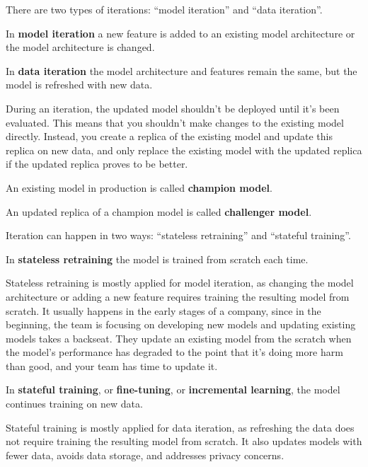 There are two types of iterations: ``model iteration'' and ``data iteration''.

In \textbf{model iteration} a new feature is added to an existing model architecture or the model architecture is
changed.
\ed

In \textbf{data iteration} the model architecture and features remain the same, but the model is refreshed with new
data.
\ed

During an iteration, the updated model shouldn't be deployed until it's been evaluated. This means that you shouldn't
make changes to the existing model directly. Instead, you create a replica of the existing model and update this
replica on new data, and only replace the existing model with the updated replica if the updated replica proves to be
better.

An existing model in production is called \textbf{champion model}.
\ed

An updated replica of a champion model is called \textbf{challenger model}.
\ed


Iteration can happen in two ways: ``stateless retraining'' and ``stateful training''.

In \textbf{stateless retraining} the model is trained from scratch each time.
\ed

Stateless retraining is mostly applied for model iteration, as changing the model architecture or adding a new
feature requires training the resulting model from scratch. It usually happens in the early stages of a company,
since in the beginning, the team is focusing on developing new models and updating existing models takes a backseat.
They update an existing model from the scratch when the model's performance has degraded to the point that it's doing
more harm than good, and your team has time to update it.

In \textbf{stateful training}, or \textbf{fine-tuning}, or \textbf{incremental learning}, the model continues training
on new data.
\ed

Stateful training is mostly applied for data iteration, as refreshing the data does not require training the
resulting model from scratch. It also updates models with fewer data, avoids data storage, and addresses privacy
concerns.


